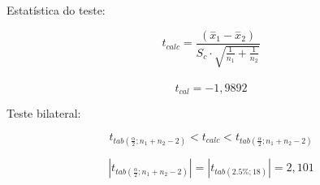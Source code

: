 \documentclass[
]{book}
\begin{document}
Estatística do teste:

\hfill\break

\[
t_{calc}  =  \frac{(\stackrel{-}{x}_{1} - \stackrel{-}{x}_{2})}  {S_{c} \cdot \sqrt{\frac{1}{n_{1}}+\frac{1}{n_{2}}}}
\]\\

\[
t_{cal}=  -1,9892
\]

\hfill\break

Teste bilateral:

\hfill\break

\[
{t}_{tab\left(\frac{\alpha }{2};{n}_{1}+{n}_{2}-2\right)} < t_{calc}  <  {t}_{tab\left(\frac{\alpha }{2};{n}_{1}+{n}_{2}-2\right)}
\]

\hfill\break

\[
|{t}_{tab\left(\frac{\alpha }{2};{n}_{1}+{n}_{2}-2\right)}|=|{t}_{tab\left(2.5\%;18\right)}|=2,101
\]

\hfill\break
\end{document}
